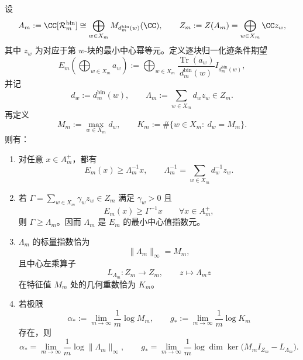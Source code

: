 \begin{theorem}[纤维群胚代数的最小中心值指数元与谱顶端]\label{thm:xi-foldbin-minimal-center-valued-index-spectrum-top}
设
\[
A_m:=\CC[\mathcal R_m^{\mathrm{bin}}]
\cong
\bigoplus_{w\in X_m}M_{d_m^{\mathrm{bin}}(w)}(\CC),
\qquad
Z_m:=Z(A_m)=\bigoplus_{w\in X_m}\CC z_w,
\]
其中 \(z_w\) 为对应于第 \(w\)-块的最小中心幂等元。定义逐块归一化迹条件期望
\[
E_m\!\left(\bigoplus_{w\in X_m}a_w\right)
:=
\bigoplus_{w\in X_m}
\frac{\operatorname{Tr}(a_w)}{d_m^{\mathrm{bin}}(w)}I_{d_m^{\mathrm{bin}}(w)},
\]
并记
\[
d_w:=d_m^{\mathrm{bin}}(w),
\qquad
\Lambda_m:=\sum_{w\in X_m}d_w z_w\in Z_m.
\]
再定义
\[
M_m:=\max_{w\in X_m}d_w,
\qquad
K_m:=\#\{w\in X_m:\ d_w=M_m\}.
\]
则有：
\begin{enumerate}
  \item 对任意 \(x\in A_m^+\)，都有
  \[
  E_m(x)\ge \Lambda_m^{-1}x,
  \qquad
  \Lambda_m^{-1}=\sum_{w\in X_m}d_w^{-1}z_w.
  \]
  \item 若 \(\Gamma=\sum_{w\in X_m}\gamma_w z_w\in Z_m\) 满足 \(\gamma_w>0\) 且
  \[
  E_m(x)\ge \Gamma^{-1}x
  \qquad
  \forall x\in A_m^+,
  \]
  则 \(\Gamma\ge \Lambda_m\)。因而 \(\Lambda_m\) 是 \(E_m\) 的最小中心值指数元。
  \item \(\Lambda_m\) 的标量指数恰为
  \[
  \|\Lambda_m\|_\infty=M_m,
  \]
  且中心左乘算子
  \[
  L_{\Lambda_m}:Z_m\to Z_m,
  \qquad
  z\mapsto \Lambda_m z
  \]
  在特征值 \(M_m\) 处的几何重数恰为 \(K_m\)。
  \item 若极限
  \[
  \alpha_*:=\lim_{m\to\infty}\frac{1}{m}\log M_m,
  \qquad
  g_*:=\lim_{m\to\infty}\frac{1}{m}\log K_m
  \]
  存在，则
  \[
  \alpha_*=
  \lim_{m\to\infty}\frac{1}{m}\log\|\Lambda_m\|_\infty,
  \qquad
  g_*=
  \lim_{m\to\infty}\frac{1}{m}\log
  \dim\ker\!\bigl(M_m I_{Z_m}-L_{\Lambda_m}\bigr).
  \]
\end{enumerate}
\end{theorem}
